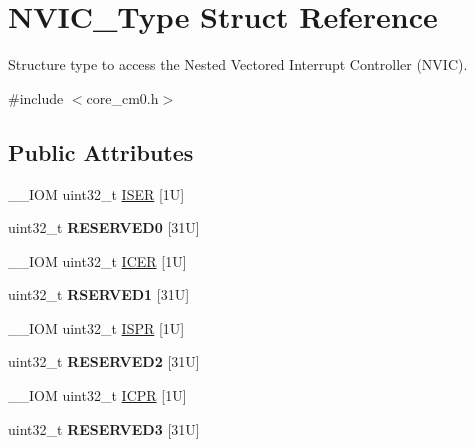 \hypertarget{struct_n_v_i_c___type}{\section{N\-V\-I\-C\-\_\-\-Type Struct Reference}
\label{struct_n_v_i_c___type}
}


Structure type to access the Nested Vectored Interrupt Controller (N\-V\-I\-C).  




{\ttfamily \#include $<$core\-\_\-cm0.\-h$>$}

\subsection*{Public Attributes}
\begin{DoxyCompactItemize}
\item 
\-\_\-\-\_\-\-I\-O\-M uint32\-\_\-t \hyperlink{struct_n_v_i_c___type_ab1d578f3fd82d9d7ba937488721c57a3}{I\-S\-E\-R} \mbox{[}1\-U\mbox{]}
\item 
\hypertarget{struct_n_v_i_c___type_a55b94454a8fcf459a284ec24bc7d3057}{uint32\-\_\-t {\bfseries R\-E\-S\-E\-R\-V\-E\-D0} \mbox{[}31\-U\mbox{]}}\label{struct_n_v_i_c___type_a55b94454a8fcf459a284ec24bc7d3057}

\item 
\-\_\-\-\_\-\-I\-O\-M uint32\-\_\-t \hyperlink{struct_n_v_i_c___type_a42e4007004da61e226adb251ac73f586}{I\-C\-E\-R} \mbox{[}1\-U\mbox{]}
\item 
\hypertarget{struct_n_v_i_c___type_a5c5d25b019ac644044623a188ae20c4c}{uint32\-\_\-t {\bfseries R\-S\-E\-R\-V\-E\-D1} \mbox{[}31\-U\mbox{]}}\label{struct_n_v_i_c___type_a5c5d25b019ac644044623a188ae20c4c}

\item 
\-\_\-\-\_\-\-I\-O\-M uint32\-\_\-t \hyperlink{struct_n_v_i_c___type_a78a829d7fa59290031fedbc95af35825}{I\-S\-P\-R} \mbox{[}1\-U\mbox{]}
\item 
\hypertarget{struct_n_v_i_c___type_a54f3c01b4b876ea7b3e0e8c3a9e9dfaf}{uint32\-\_\-t {\bfseries R\-E\-S\-E\-R\-V\-E\-D2} \mbox{[}31\-U\mbox{]}}\label{struct_n_v_i_c___type_a54f3c01b4b876ea7b3e0e8c3a9e9dfaf}

\item 
\-\_\-\-\_\-\-I\-O\-M uint32\-\_\-t \hyperlink{struct_n_v_i_c___type_acf8209acf3f339d8eb2df9d3faaa10ae}{I\-C\-P\-R} \mbox{[}1\-U\mbox{]}
\item 
\hypertarget{struct_n_v_i_c___type_a3a0022743541fcf7385584dab63189ce}{uint32\-\_\-t {\bfseries R\-E\-S\-E\-R\-V\-E\-D3} \mbox{[}31\-U\mbox{]}}\label{struct_n_v_i_c___type_a3a0022743541fcf7385584dab63189ce}


\end{DoxyCompactItemize}
